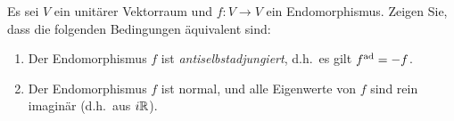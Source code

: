 \documentclass[a4paper, 10pt]{scrartcl}
\begin{document}





\begin{question}[subtitle = Charakterisierung antiselbstadjungierter Endomorphismen]
  Es sei $V$ ein unitärer Vektorraum und $f \colon V \to V$ ein Endomorphismus.
  Zeigen Sie, dass die folgenden Bedingungen äquivalent sind:
  \begin{enumerate}
    \item
      Der Endomorphismus $f$ ist \emph{antiselbstadjungiert}, d.h.\ es gilt $f^{\operatorname{ad}} = -f$.
    \item
      Der Endomorphismus $f$ ist normal, und alle Eigenwerte von $f$ sind rein imaginär (d.h.\ aus $i \mathbb{R}$).
  \end{enumerate}
\end{question}





\end{document}
